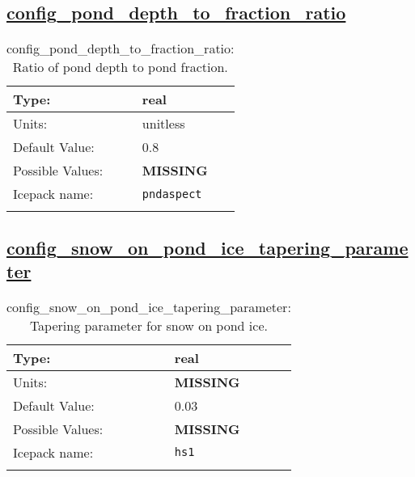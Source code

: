 \subsection[config\_pond\_depth\_to\_fraction\_ratio]{\hyperref[sec:nm_tab_meltponds]{config\_pond\_depth\_to\_fraction\_ratio}}
\label{subsec:nm_sec_config_pond_depth_to_fraction_ratio}
\begin{center}
\begin{longtable}{| p{2.0in} || p{4.0in} |}
    \hline
    Type: & real \\
    \hline
    Units: & \si{unitless} \\
    \hline
    Default Value: & 0.8 \\
    \hline
    Possible Values: & {\bf \color{red} MISSING} \\
    \hline
    \hline
    Icepack name: & \verb+pndaspect+ \\
    \caption{config\_pond\_depth\_to\_fraction\_ratio: Ratio of pond depth to pond fraction.}
\end{longtable}
\end{center}
\subsection[config\_snow\_on\_pond\_ice\_tapering\_parameter]{\hyperref[sec:nm_tab_meltponds]{config\_snow\_on\_pond\_ice\_tapering\_parameter}}
\label{subsec:nm_sec_config_snow_on_pond_ice_tapering_parameter}
\begin{center}
\begin{longtable}{| p{2.0in} || p{4.0in} |}
    \hline
    Type: & real \\
    \hline
    Units: & {\bf \color{red} MISSING} \\
    \hline
    Default Value: & 0.03 \\
    \hline
    Possible Values: & {\bf \color{red} MISSING} \\
    \hline
    \hline
    Icepack name: & \verb+hs1+ \\
    \caption{config\_snow\_on\_pond\_ice\_tapering\_parameter: Tapering parameter for snow on pond ice.}
\end{longtable}
\end{center}
